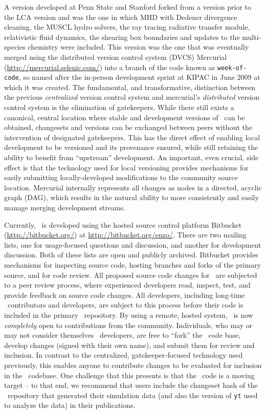 A version developed at Penn State and Stanford forked from a version
prior to the LCA version and was the one in which MHD with Dedener
divergence cleaning, the MUSCL hydro solvers, the ray tracing
radiative transfer module, relativistic fluid dynamics, the shearing
box boundaries and updates to the multi-species chemistry were
included. This version was the one that was eventually merged using
the distributed version control system (DVCS) Mercurial
(\url{http://mercurial.selenic.com/}) into a branch of the code known
as \texttt{week-of-code}, so named after the in-person development
sprint at KIPAC in June 2009 at which it was created.  The
fundamental, and transformative, distinction between the previous
\textit{centralized} version control system and mercurial's
\textit{distributed} version control system is the elimination of
gatekeepers.  While there still exists a canonical, central location
where stable and development versions of \enzo\ can be obtained,
changesets and versions can be exchanged between peers without the
intervention of designated gatekeepers.  This has the direct effect of
enabling local development to be versioned and its provenance ensured,
while still retaining the ability to benefit from ``upstream''
development.  An important, even crucial, side effect is that the
technology used for local versioning provides mechanisms for easily
submitting locally-developed modifications to the community source
location.  Mercurial internally represents all changes as nodes in a
directed, acyclic graph (DAG), which results in the natural ability to
more consistently and easily manage merging development streams.

Currently, \enzo\ is developed using the hosted source control
platform Bitbucket (\url{http://bitbucket.org/}) at
\url{http://bitbucket.org/enzo/}.  There are two mailing lists, one
for usage-focused questions and discussion, and another for
development discussion.  Both of these lists are open and publicly
archived.  Bitbucket provides mechanisms for inspecting source code,
hosting branches and forks of the primary source, and for code review.
All proposed source code changes for \enzo\ are subjected to a peer
review process, where experienced developers read, inspect, test, and
provide feedback on source code changes.  All developers, including
long-time \enzo\ contributors and developers, are subject to this
process before their code is included in the primary \enzo\
repository.  By using a remote, hosted system, \enzo\ is now
\textit{completely} open to contributions from the community.
Individuals, who may or may not consider themselves \enzo\ developers,
are free to ``fork'' the \enzo\ code base, develop changes (signed
with their own name), and submit them for review and inclusion.  In
contrast to the centralized, gatekeeper-focused technology used
previously, this enables anyone to contribute changes to be evaluated
for inclusion in the \enzo\ codebase.  One challenge that this
presents is that the \enzo\ code is a moving target -- to that end, we
recommend that users include the changeset hash of the \enzo\
repository that generated their simulation data (and also the version
of \texttt{yt} used to analyze the data) in their publications.

